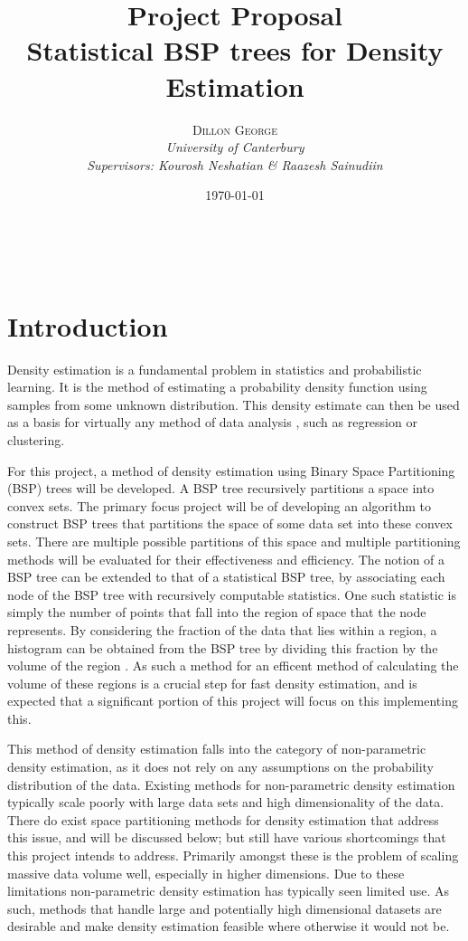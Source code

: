 \documentclass[a4paper, 10pt]{report} %
\title{\textbf{Project Proposal}\\ %
Statistical BSP trees for Density Estimation} %
\author{\textsc{Dillon George} %
\\{\textit{University of Canterbury}}
\\{\textit{Supervisors: Kourosh Neshatian \& Raazesh Sainudiin}}} %
\date{\today} %
\makeatletter
\renewcommand{\maketitle}{ %
\begin{flushright} %
{\LARGE\@title} %

\vspace{10pt} %

{\large\@author} %
\\\@date %


\end{flushright}
}
\makeatother
\begin{document}
\maketitle %



\section*{Introduction}

Density estimation is a fundamental problem in statistics and probabilistic learning. It is the method of estimating a probability density function using samples from some unknown distribution. This density estimate can then be used as a basis for virtually any method of data analysis \cite{gray2003nonparametric, Bishop:1995:NNP:525960}, such as regression or clustering.

For this project, a method of density estimation using Binary Space Partitioning (BSP) trees will be developed.
A BSP tree recursively partitions a space into convex sets. The primary focus project will be of developing an algorithm to construct BSP trees that partitions the space of some data set into these convex sets. There are multiple possible partitions of this space and multiple partitioning methods will be evaluated for their effectiveness and efficiency. The notion of a BSP tree can be extended to that of a statistical BSP tree, by associating each node of the BSP tree with recursively computable statistics. One such statistic is simply the number of points that fall into the region of space that the node represents. By considering the fraction of the data that lies within a region, a histogram can be obtained from the BSP tree by dividing this fraction by the volume of the region \cite{sainudiin2013posterior}. As such a method for an efficent method of calculating the volume of these regions is a crucial step for fast density estimation, and is expected that a significant portion of this project will focus on this implementing this.

This method of density estimation falls into the category of non-parametric density estimation, as it does not rely on any assumptions on the probability distribution of the data. Existing methods for non-parametric density estimation typically scale poorly with large data sets and high dimensionality of the data. There do exist space partitioning methods for density estimation that address this issue, and will be discussed below; but still have various shortcomings that this project intends to address. Primarily amongst these is the problem of scaling massive data volume well, especially in higher dimensions. Due to these limitations non-parametric density estimation has typically seen limited use. As such, methods that handle large and potentially high dimensional datasets are desirable and make density estimation feasible where otherwise it would not be.
\end{document}
